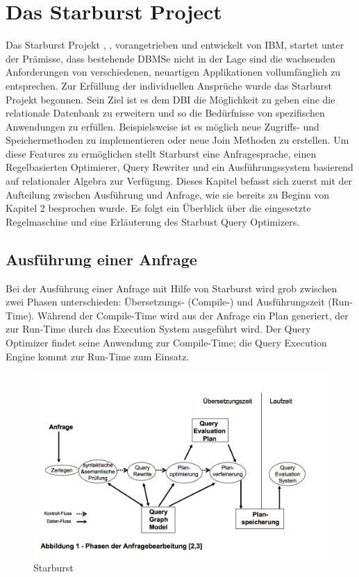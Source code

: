 \section{Das Starburst Project}

Das Starburst Projekt \cite{lohman1988Starbust}, \cite{haas1989extensible}, vorangetrieben und entwickelt von IBM,  startet unter der Prämisse, dass bestehende DBMSe nicht in der Lage sind die wachsenden Anforderungen von verschiedenen, neuartigen Applikationen vollumfänglich zu entsprechen. Zur Erfüllung der individuellen Ansprüche wurde das Starburst Projekt begonnen. Sein Ziel ist es dem \ac{DBI} die Möglichkeit zu geben eine die relationale Datenbank zu erweitern und so die Bedürfnisse von spezifischen Anwendungen zu erfüllen. Beispielsweise ist es möglich neue Zugriffs- und Speichermethoden zu implementieren oder neue Join Methoden zu erstellen. Um diese Features zu ermöglichen stellt Starburst eine Anfragesprache, einen Regelbasierten Optimierer, Query Rewriter und ein Ausführungssystem basierend auf relationaler Algebra zur Verfügung. Dieses Kapitel befasst sich zuerst mit der Aufteilung zwischen Ausführung und Anfrage, wie sie bereits zu Beginn von Kapitel 2 besprochen wurde. Es folgt ein Überblick über die eingesetzte Regelmaschine und eine Erläuterung des Starbust Query Optimizers.

\subsection{Ausführung einer Anfrage}

Bei der Ausführung einer Anfrage mit Hilfe von Starburst wird grob zwischen zwei Phasen unterschieden: Übersetzungs- (Compile-) und Ausführungszeit (Run-Time). Während der Compile-Time wird aus der Anfrage ein Plan generiert, der zur Run-Time durch das Execution System ausgeführt wird. Der Query Optimizer findet seine Anwendung zur Compile-Time; die Query Execution Engine kommt zur Run-Time zum Einsatz.

\begin{figure}[h]
  \centering
  \includegraphics[width=\textwidth]{02_Grundlagen/Starburst.png}
  \caption{Starburst}
\end{figure}

